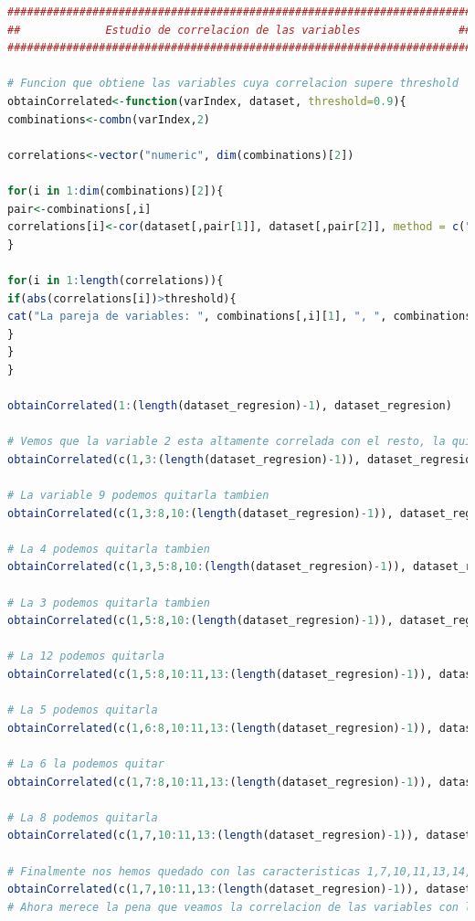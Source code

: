 \documentclass[12pt,a4paper]{article}
\begin{document}
\begin{lstlisting}[basicstyle=\tiny, language=R]
#######################################################################
##             Estudio de correlacion de las variables               ##
#######################################################################

# Funcion que obtiene las variables cuya correlacion supere threshold
obtainCorrelated<-function(varIndex, dataset, threshold=0.9){
combinations<-combn(varIndex,2)

correlations<-vector("numeric", dim(combinations)[2])

for(i in 1:dim(combinations)[2]){
pair<-combinations[,i]
correlations[i]<-cor(dataset[,pair[1]], dataset[,pair[2]], method = c("pearson", "kendall", "spearman"))
}

for(i in 1:length(correlations)){
if(abs(correlations[i])>threshold){
cat("La pareja de variables: ", combinations[,i][1], ", ", combinations[,i][2], " tiene una correlacion: ", correlations[i], "\n")
}
}
}

obtainCorrelated(1:(length(dataset_regresion)-1), dataset_regresion)

# Vemos que la variable 2 esta altamente correlada con el resto, la quitamos y repetimos
obtainCorrelated(c(1,3:(length(dataset_regresion)-1)), dataset_regresion)

# La variable 9 podemos quitarla tambien
obtainCorrelated(c(1,3:8,10:(length(dataset_regresion)-1)), dataset_regresion)

# La 4 podemos quitarla tambien
obtainCorrelated(c(1,3,5:8,10:(length(dataset_regresion)-1)), dataset_regresion)

# La 3 podemos quitarla tambien
obtainCorrelated(c(1,5:8,10:(length(dataset_regresion)-1)), dataset_regresion)

# La 12 podemos quitarla
obtainCorrelated(c(1,5:8,10:11,13:(length(dataset_regresion)-1)), dataset_regresion)

# La 5 podemos quitarla
obtainCorrelated(c(1,6:8,10:11,13:(length(dataset_regresion)-1)), dataset_regresion)

# La 6 la podemos quitar
obtainCorrelated(c(1,7:8,10:11,13:(length(dataset_regresion)-1)), dataset_regresion)

# La 8 podemos quitarla
obtainCorrelated(c(1,7,10:11,13:(length(dataset_regresion)-1)), dataset_regresion)

# Finalmente nos hemos quedado con las caracteristicas 1,7,10,11,13,14,15
obtainCorrelated(c(1,7,10:11,13:(length(dataset_regresion)-1)), dataset_regresion, -1)
# Ahora merece la pena que veamos la correlacion de las variables con la de salida



\end{lstlisting}
\end{document}

